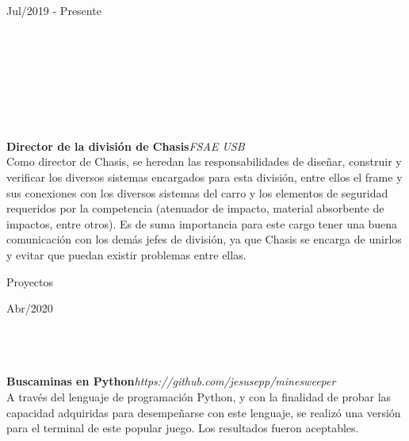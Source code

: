 \documentclass[10pt]{article}
\begin{document}
\begin{vwcol}[widths={0.22,0.78},
 sep=.8cm, rule=0pt,indent=0em,lines=8] 
\hspace{5pt}Jul/2019 - Presente\par
\hfill\\
\hfill\\
\hfill\\
\hfill\\
\hfill\\
\hfill\\
\hfill\\
\textbf{Director de la división de Chasis}\hfill \textit{FSAE USB}\\
Como director de Chasis, se heredan las responsabilidades de diseñar, construir y verificar los diversos sistemas encargados para esta división, entre ellos el frame y sus conexiones con los diversos sistemas del carro y los elementos de seguridad requeridos por la competencia (atenuador de impacto, material absorbente de impactos, entre otros). Es de suma importancia para este cargo tener una buena comunicación con los demás jefes de división, ya que Chasis se encarga de unirlos y evitar que puedan existir problemas entre ellas.\par
\end{vwcol}
\begin{LARGE}
\color{blue!50!black}
Proyectos\par
\end{LARGE}
\begin{vwcol}[widths={0.22,0.78},
 sep=.8cm, rule=0pt,indent=0em,lines=4] 
\hspace{5pt}Abr/2020\par
\hfill\\
\hfill\\
\hfill\\
\textbf{Buscaminas en Python}\hfill\textit{https://github.com/jesusepp/minesweeper\\} 
A través del lenguaje de programación Python, y con la finalidad de probar las capacidad adquiridas para desempeñarse con este lenguaje, se realizó una versión para el terminal de este popular juego. Los resultados fueron aceptables.\par
\end{vwcol}
\end{document}
